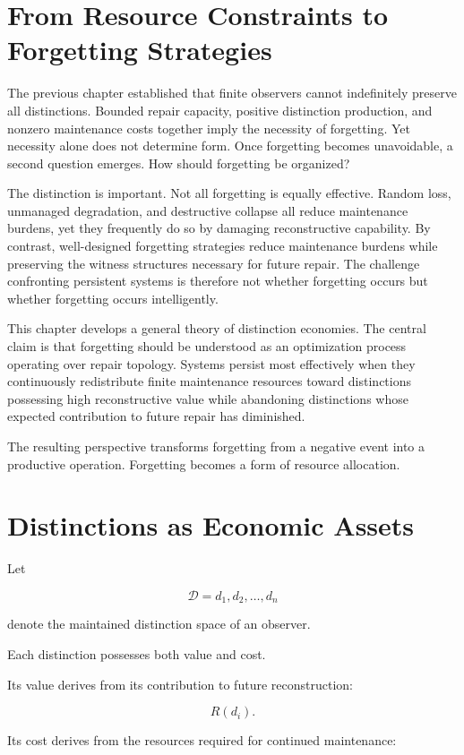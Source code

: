 \documentclass[12pt,oneside]{book}
\theoremstyle{plain} \newtheorem{theorem}{Theorem}[chapter] \newtheorem{lemma}[theorem]{Lemma} \newtheorem{proposition}[theorem]{Proposition} \newtheorem{corollary}[theorem]{Corollary}
\theoremstyle{definition} \newtheorem{definition}[theorem]{Definition} \newtheorem{axiom}[theorem]{Axiom} \newtheorem{construction}[theorem]{Construction}
\theoremstyle{remark} \newtheorem{remark}[theorem]{Remark} \newtheorem{example}[theorem]{Example}
\newcommand{\D}{\mathcal{D}} \newcommand{\R}{\mathcal{R}} \newcommand{\F}{\mathcal{F}} \newcommand{\U}{\mathcal{U}} \newcommand{\M}{\mathcal{M}} \newcommand{\G}{\Gamma}
\begin{document}
\section{From Resource Constraints to Forgetting Strategies}

The previous chapter established that finite observers cannot indefinitely preserve all distinctions. Bounded repair capacity, positive distinction production, and nonzero maintenance costs together imply the necessity of forgetting. Yet necessity alone does not determine form. Once forgetting becomes unavoidable, a second question emerges. How should forgetting be organized?

The distinction is important. Not all forgetting is equally effective. Random loss, unmanaged degradation, and destructive collapse all reduce maintenance burdens, yet they frequently do so by damaging reconstructive capability. By contrast, well-designed forgetting strategies reduce maintenance burdens while preserving the witness structures necessary for future repair. The challenge confronting persistent systems is therefore not whether forgetting occurs but whether forgetting occurs intelligently.

This chapter develops a general theory of distinction economies. The central claim is that forgetting should be understood as an optimization process operating over repair topology. Systems persist most effectively when they continuously redistribute finite maintenance resources toward distinctions possessing high reconstructive value while abandoning distinctions whose expected contribution to future repair has diminished.

The resulting perspective transforms forgetting from a negative event into a productive operation. Forgetting becomes a form of resource allocation.

\section{Distinctions as Economic Assets}

Let

\[
\D
=
{d_1,d_2,\ldots,d_n}
\]

denote the maintained distinction space of an observer.

Each distinction possesses both value and cost.

Its value derives from its contribution to future reconstruction:

\[
R(d_i).
\]

Its cost derives from the resources required for continued maintenance:
\end{document}
